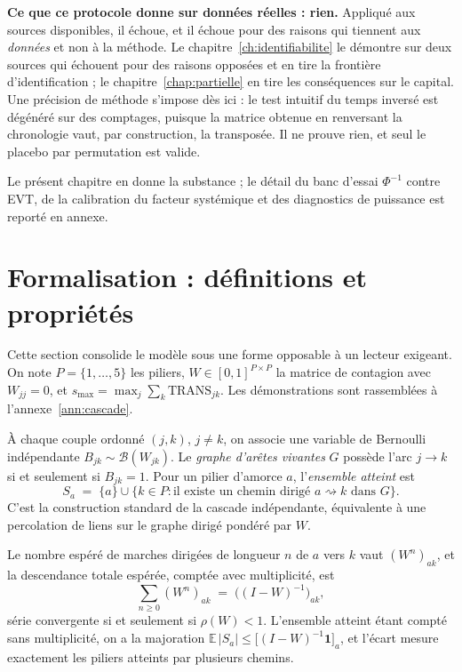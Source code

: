 \begin{attention}
\textbf{Ce que ce protocole donne sur données réelles : rien.} Appliqué aux sources
disponibles, il échoue, et il échoue pour des raisons qui tiennent aux \emph{données} et non à
la méthode. Le chapitre~\ref{ch:identifiabilite} le démontre sur deux sources qui échouent pour
des raisons opposées et en tire la frontière d'identification ; le
chapitre~\ref{chap:partielle} en tire les conséquences sur le capital. Une précision de méthode
s'impose dès ici : le test intuitif du \og temps inversé \fg{} est dégénéré
sur des comptages, puisque la matrice obtenue en renversant la chronologie vaut, par
construction, la transposée. Il ne prouve rien, et seul le placebo par permutation est valide.
\end{attention}

Le présent chapitre en donne la substance ; le détail du banc d'essai
$\Phi^{-1}$ contre EVT, de la calibration du facteur systémique et des diagnostics de
puissance est reporté en annexe.


\section{Formalisation : définitions et propriétés}
\label{sec:formalisation}

Cette section consolide le modèle sous une forme opposable à un lecteur exigeant. On note
$P=\{1,\dots,5\}$ les piliers, $W\in[0,1]^{P\times P}$ la matrice de contagion avec
$W_{jj}=0$, et $s_{\max}=\max_j\sum_k \mathrm{TRANS}_{jk}$. Les démonstrations sont
rassemblées à l'annexe~\ref{ann:cascade}.

\begin{definition}
\label{def:cascade}
À chaque couple ordonné $(j,k)$, $j\neq k$, on associe une variable de Bernoulli
indépendante $B_{jk}\sim\mathcal B(W_{jk})$. Le \emph{graphe d'arêtes vivantes} $G$ possède
l'arc $j\to k$ si et seulement si $B_{jk}=1$. Pour un pilier d'amorce $a$, l'\emph{ensemble
atteint} est
\[
  S_a \;=\; \{a\}\cup\{k\in P : \text{il existe un chemin dirigé } a\rightsquigarrow k \text{ dans } G\}.
\]
C'est la construction standard de la cascade indépendante, équivalente à une percolation
de liens sur le graphe dirigé pondéré par $W$.
\end{definition}

\begin{proposition}
\label{prop:reduite}
Le nombre espéré de marches dirigées de longueur $n$ de $a$ vers $k$ vaut $(W^n)_{ak}$, et la
descendance totale espérée, comptée avec multiplicité, est
\[
  \sum_{n\ge 0}(W^n)_{ak} \;=\; \bigl((I-W)^{-1}\bigr)_{ak},
\]
série convergente si et seulement si $\rho(W)<1$. L'ensemble atteint étant compté sans
multiplicité, on a la majoration $\mathbb E\,|S_a|\le \bigl[(I-W)^{-1}\mathbf 1\bigr]_a$, et
l'écart mesure exactement les piliers atteints par plusieurs chemins.
\end{proposition}

